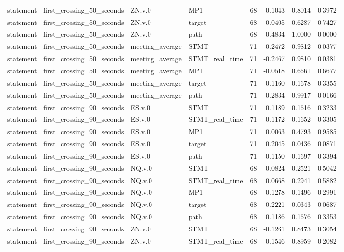 \begin{tabular}{llllrrrr}
statement & first_crossing_50_seconds & ZN.v.0 & MP1 & 68 & -0.1043 & 0.8014 & 0.3972 \\
statement & first_crossing_50_seconds & ZN.v.0 & target & 68 & -0.0405 & 0.6287 & 0.7427 \\
statement & first_crossing_50_seconds & ZN.v.0 & path & 68 & -0.4834 & 1.0000 & 0.0000 \\
statement & first_crossing_50_seconds & meeting_average & STMT & 71 & -0.2472 & 0.9812 & 0.0377 \\
statement & first_crossing_50_seconds & meeting_average & STMT_real_time & 71 & -0.2467 & 0.9810 & 0.0381 \\
statement & first_crossing_50_seconds & meeting_average & MP1 & 71 & -0.0518 & 0.6661 & 0.6677 \\
statement & first_crossing_50_seconds & meeting_average & target & 71 & 0.1160 & 0.1678 & 0.3355 \\
statement & first_crossing_50_seconds & meeting_average & path & 71 & -0.2834 & 0.9917 & 0.0166 \\
statement & first_crossing_90_seconds & ES.v.0 & STMT & 71 & 0.1189 & 0.1616 & 0.3233 \\
statement & first_crossing_90_seconds & ES.v.0 & STMT_real_time & 71 & 0.1172 & 0.1652 & 0.3305 \\
statement & first_crossing_90_seconds & ES.v.0 & MP1 & 71 & 0.0063 & 0.4793 & 0.9585 \\
statement & first_crossing_90_seconds & ES.v.0 & target & 71 & 0.2045 & 0.0436 & 0.0871 \\
statement & first_crossing_90_seconds & ES.v.0 & path & 71 & 0.1150 & 0.1697 & 0.3394 \\
statement & first_crossing_90_seconds & NQ.v.0 & STMT & 68 & 0.0824 & 0.2521 & 0.5042 \\
statement & first_crossing_90_seconds & NQ.v.0 & STMT_real_time & 68 & 0.0668 & 0.2941 & 0.5882 \\
statement & first_crossing_90_seconds & NQ.v.0 & MP1 & 68 & 0.1278 & 0.1496 & 0.2991 \\
statement & first_crossing_90_seconds & NQ.v.0 & target & 68 & 0.2221 & 0.0343 & 0.0687 \\
statement & first_crossing_90_seconds & NQ.v.0 & path & 68 & 0.1186 & 0.1676 & 0.3353 \\
statement & first_crossing_90_seconds & ZN.v.0 & STMT & 68 & -0.1261 & 0.8473 & 0.3054 \\
statement & first_crossing_90_seconds & ZN.v.0 & STMT_real_time & 68 & -0.1546 & 0.8959 & 0.2082 \\

\end{tabular}
